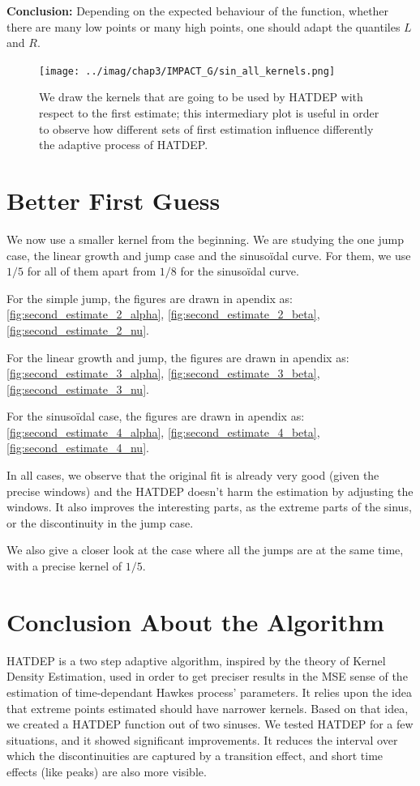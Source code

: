 \documentclass[11pt]{book}
\begin{document}
\textbf{Conclusion:} Depending on the expected behaviour of the function, whether there are many low points or many high points, one should adapt the quantiles $L$ and $R$.


\begin{figure}
\centering
\texttt{[image: ../imag/chap3/IMPACT\_G/sin\_all\_kernels.png]}
\caption{We draw the kernels that are going to be used by HATDEP with respect to the first estimate; this intermediary plot is useful in order to observe how different sets of first estimation influence differently the adaptive process of HATDEP.}
\label{fig:impact_g_sin}
\end{figure}




\section{Better First Guess}
\label{section_second_simul}
We now use a smaller kernel from the beginning. We are studying the one jump case, the linear growth and jump case and the sinusoïdal curve. For them, we use $1/5$ for all of them apart from $1/8$ for the sinusoïdal curve. 



For the simple jump, the figures are drawn in apendix as: \ref{fig:second_estimate_2_alpha}, \ref{fig:second_estimate_2_beta}, \ref{fig:second_estimate_2_nu}.

For the linear growth and jump, the figures are drawn in apendix as: \ref{fig:second_estimate_3_alpha}, \ref{fig:second_estimate_3_beta}, \ref{fig:second_estimate_3_nu}.

For the sinusoïdal case, the figures are drawn in apendix as: \ref{fig:second_estimate_4_alpha}, \ref{fig:second_estimate_4_beta}, \ref{fig:second_estimate_4_nu}.

In all cases, we observe that the original fit is already very good (given the precise windows) and the HATDEP doesn't harm the estimation by adjusting the windows. It also improves the interesting parts, as the extreme parts of the sinus, or the discontinuity in the jump case.


We also give a closer look at the case where all the jumps are at the same time, with a precise kernel of $1/5$. 




\section{Conclusion About the Algorithm}
HATDEP is a two step adaptive algorithm, inspired by the theory of Kernel Density Estimation, used in order to get preciser results in the MSE sense of the estimation of time-dependant Hawkes process' parameters. It relies upon the idea that extreme points estimated should have narrower kernels. Based on that idea, we created a HATDEP function out of two sinuses. We tested HATDEP for a few situations, and it showed significant improvements. It reduces the interval over which the discontinuities are captured by a transition effect, and short time effects (like peaks) are also more visible.
\end{document}
